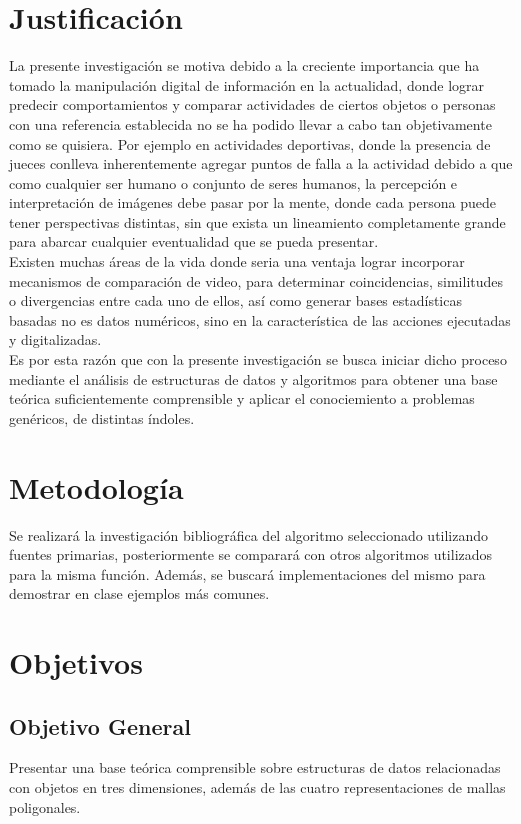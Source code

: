 \documentclass[11pt,letterpaper]{article}     %
\begin{document}
\section{Justificación}
La presente investigaci\' on se motiva debido a la creciente importancia que ha tomado la manipulaci\' on digital de informaci\' on en la actualidad, donde lograr predecir comportamientos y comparar actividades de ciertos objetos o personas con una referencia establecida no se ha podido llevar a cabo tan objetivamente como se quisiera. Por ejemplo en actividades deportivas, donde la presencia de jueces conlleva inherentemente agregar puntos de falla a la actividad debido a que como cualquier ser humano o conjunto de seres humanos, la percepci\' on e interpretaci\' on de im\' agenes debe pasar por la mente, donde cada persona puede tener perspectivas distintas, sin que exista un lineamiento completamente grande para abarcar cualquier eventualidad que se pueda presentar.\\
Existen muchas \' areas de la vida donde seria una ventaja lograr incorporar mecanismos de comparaci\' on de video, para determinar coincidencias, similitudes o divergencias entre cada uno de ellos, as\'i como generar bases estad\' isticas basadas no es datos num\' ericos, sino en la caracter\' istica de las acciones ejecutadas y digitalizadas.\\
Es por esta raz\' on que con la presente investigaci\' on se busca iniciar dicho proceso mediante el an\' alisis de estructuras de datos y algoritmos para obtener una base te\' orica suficientemente comprensible y aplicar el conociemiento a problemas gen\' ericos, de distintas \' indoles.

\section{Metodolog\' ia}
Se realizar\' a la investigaci\' on bibliogr\' afica del algoritmo seleccionado utilizando fuentes primarias, posteriormente se comparar\' a con otros algoritmos utilizados para la misma funci\' on. Adem\' as, se buscar\' a implementaciones del mismo para demostrar en clase ejemplos m\' as comunes.



\section{Objetivos}
\subsection{Objetivo General}
Presentar una base te\' orica comprensible sobre estructuras de datos relacionadas con objetos en tres dimensiones, adem\' as de las cuatro representaciones de mallas poligonales.
\end{document}
